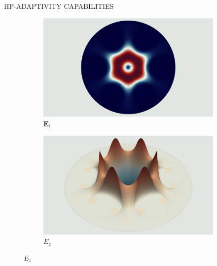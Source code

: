 \documentclass[debug]{beamer} %
\begin{document}
\begin{frame}
\begin{columns}
\begin{column}{0.45\textwidth}
{\begin{block}{\boxnumber HP-ADAPTIVITY CAPABILITIES }
			\begin{figure}[hb]
	        	\begin{mdframed}[backgroundcolor=bggrey]
					\centering
					\begin{subfigure}[b]{.4999\textwidth}
						\centering
						\caption*{$\displaystyle\bm{E}_t$}
						\includegraphics[width=1\linewidth]{images/et1posterHoley.png}%
					\end{subfigure}\hfill
					\begin{subfigure}[b]{.4999\textwidth}
						\centering
						\caption*{$\displaystyle E_z$}
						\includegraphics[width=1\linewidth]{images/ez1posterHoley.png}%
					\end{subfigure}


\end{mdframed}
\end{figure}
\end{block}}
\end{column}
\end{columns}
\end{frame}
\end{document}
